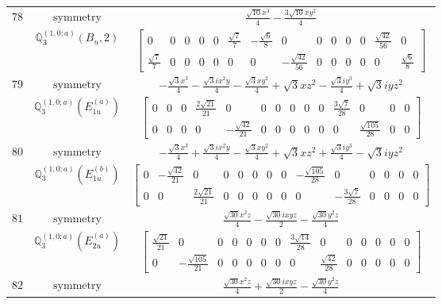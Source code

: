 \documentclass[fleqn,8pt,landscape]{jsarticle}
\begin{document}
\begin{longtable}{ccc}
$ 78 $ & $ \text{symmetry} $ & $ \frac{\sqrt{10} x^{3}}{4} - \frac{3 \sqrt{10} x y^{2}}{4} $ \\
$  $ & $ \mathbb{Q}_{3}^{(1,0;a)}(B_{u},2) $ & $ \begin{bmatrix} 0 & 0 & 0 & 0 & 0 & \frac{\sqrt{7}}{7} & - \frac{\sqrt{6}}{8} & 0 & 0 & 0 & 0 & 0 & \frac{\sqrt{42}}{56} & 0 \\ \frac{\sqrt{7}}{7} & 0 & 0 & 0 & 0 & 0 & 0 & - \frac{\sqrt{42}}{56} & 0 & 0 & 0 & 0 & 0 & \frac{\sqrt{6}}{8} \end{bmatrix} $ \\ \hline
$ 79 $ & $ \text{symmetry} $ & $ - \frac{\sqrt{3} x^{3}}{4} - \frac{\sqrt{3} i x^{2} y}{4} - \frac{\sqrt{3} x y^{2}}{4} + \sqrt{3} x z^{2} - \frac{\sqrt{3} i y^{3}}{4} + \sqrt{3} i y z^{2} $ \\
$  $ & $ \mathbb{Q}_{3}^{(1,0;a)}(E_{1u}^{(a)}) $ & $ \begin{bmatrix} 0 & 0 & 0 & \frac{2 \sqrt{21}}{21} & 0 & 0 & 0 & 0 & 0 & 0 & \frac{3 \sqrt{7}}{28} & 0 & 0 & 0 \\ 0 & 0 & 0 & 0 & - \frac{\sqrt{42}}{21} & 0 & 0 & 0 & 0 & 0 & 0 & \frac{\sqrt{105}}{28} & 0 & 0 \end{bmatrix} $ \\ \hline
$ 80 $ & $ \text{symmetry} $ & $ - \frac{\sqrt{3} x^{3}}{4} + \frac{\sqrt{3} i x^{2} y}{4} - \frac{\sqrt{3} x y^{2}}{4} + \sqrt{3} x z^{2} + \frac{\sqrt{3} i y^{3}}{4} - \sqrt{3} i y z^{2} $ \\
$  $ & $ \mathbb{Q}_{3}^{(1,0;a)}(E_{1u}^{(b)}) $ & $ \begin{bmatrix} 0 & - \frac{\sqrt{42}}{21} & 0 & 0 & 0 & 0 & 0 & 0 & - \frac{\sqrt{105}}{28} & 0 & 0 & 0 & 0 & 0 \\ 0 & 0 & \frac{2 \sqrt{21}}{21} & 0 & 0 & 0 & 0 & 0 & 0 & - \frac{3 \sqrt{7}}{28} & 0 & 0 & 0 & 0 \end{bmatrix} $ \\ \hline
$ 81 $ & $ \text{symmetry} $ & $ \frac{\sqrt{30} x^{2} z}{4} - \frac{\sqrt{30} i x y z}{2} - \frac{\sqrt{30} y^{2} z}{4} $ \\
$  $ & $ \mathbb{Q}_{3}^{(1,0;a)}(E_{2u}^{(a)}) $ & $ \begin{bmatrix} \frac{\sqrt{21}}{21} & 0 & 0 & 0 & 0 & 0 & 0 & \frac{3 \sqrt{14}}{28} & 0 & 0 & 0 & 0 & 0 & 0 \\ 0 & - \frac{\sqrt{105}}{21} & 0 & 0 & 0 & 0 & 0 & 0 & \frac{\sqrt{42}}{28} & 0 & 0 & 0 & 0 & 0 \end{bmatrix} $ \\ \hline
$ 82 $ & $ \text{symmetry} $ & $ \frac{\sqrt{30} x^{2} z}{4} + \frac{\sqrt{30} i x y z}{2} - \frac{\sqrt{30} y^{2} z}{4} $ \\

\end{longtable}
\end{document}

